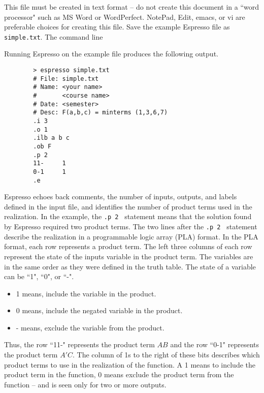 This file must be created in text format -- do not create this document
in a ``word processor" such as MS Word or WordPerfect.  NotePad, Edit, 
emacs, or vi are preferable choices for creating this file.  Save 
the example Espresso file as \verb+simple.txt+.  The command
line 

Running
Espresso on the example file produces the following output.

\begin{verbatim}
        > espresso simple.txt
        # File:	simple.txt
        # Name: <your name>
        #       <course name>
        # Date: <semester>
        # Desc:	F(a,b,c) = minterms (1,3,6,7)
        .i 3
        .o 1
        .ilb a b c
        .ob F
        .p 2
        11-     1
        0-1     1
        .e
\end{verbatim}

Espresso echoes back comments, the number of inputs, outputs, 
and labels defined in the input file,  and identifies the number of product
terms used in the realization.  In the example, the 
\verb+.p 2 + statement means that the solution found by Espresso 
required two product terms.  The two lines after the \verb+.p 2 + 
statement describe the realization in a programmable logic 
array (PLA) format.  In the PLA format, each row represents a 
product term.  The left three columns of each row represent the 
state of the inputs variable in the product term.  The variables 
are in the same order as they were defined in the truth table.
The state of a variable can be ``1", ``0", or ``-".
\begin{itemize}
\item 1 means, include the variable in the product.
\item 0 means, include the negated variable in the product.
\item - means, exclude the variable from the product.
\end{itemize}

Thus, the row ``11-" represents the product term $AB$ and the row ``0-1"
represents the product term $A'C$.  The column of 1s to the right 
of these bits describes which product terms to use in the realization
of the function.  A 1 means to include the product term in the 
function, 0 means exclude the product term from the function -- 
and is seen only for two or more outputs.

